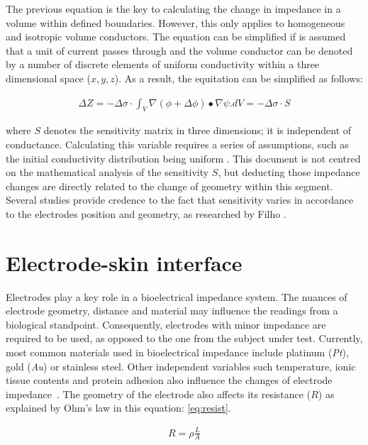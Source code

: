 The previous equation is the key to calculating the change in impedance in a volume within defined boundaries. However, this only applies to homogeneous and isotropic volume conductors. The equation can be simplified if is assumed that a unit of current passes through and the volume conductor can be denoted by a number of discrete elements of uniform conductivity within a three dimensional space ($x,y,z$). As a result, the equitation can be simplified as follows:

\begin{align}
	\label{eq:Geselowitz2}
	\Delta Z = - \Delta \sigma \cdot \int_V \nabla(\phi + \Delta \phi) \bullet \nabla \psi . dV = - \Delta \sigma \cdot S
\end{align}

where $S$ denotes the sensitivity matrix in three dimensions; it is independent of conductance. Calculating this variable requires a series of assumptions, such as the initial conductivity distribution being uniform \cite{dehghani1999incorporating}. This document is not centred on the mathematical analysis of the sensitivity $S$, but deducting those impedance changes are directly related to the change of geometry within this segment. Several studies provide credence to the fact that sensitivity varies in accordance to the electrodes position and geometry, as researched by Filho \cite{bertemes2002tissue}.

\section{Electrode-skin interface}  %
\label{section impedance electrodes}
Electrodes play a key role in a bioelectrical impedance system. The nuances of electrode geometry, distance and material may influence the readings from a biological standpoint. Consequently, electrodes with minor impedance are required to be used, as opposed to the one from the subject under test. Currently, most common materials used in bioelectrical impedance include platinum (\textit{Pt}), gold (\textit{Au}) or stainless steel. Other independent variables such temperature, ionic tissue contents and protein adhesion also influence the changes of electrode impedance~\cite{martinsen2011bioimpedance, ivorra2003bioimpedance}. The geometry of the electrode also affects its resistance ($R$) as explained by Ohm's law in this equation: \ref{eq:resist}.

\begin{align}
	\label{eq:resist}
	R = \rho \frac{L}{A}
\end{align}


